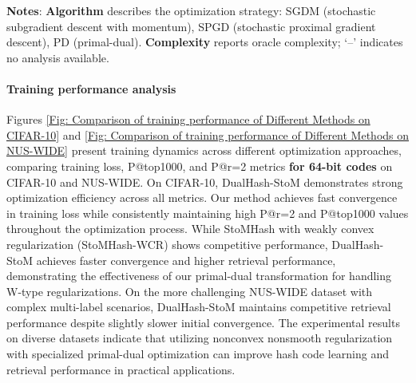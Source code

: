 \begin{table}[htbp]
    \centering
    \caption{Configurations of different W-type regularizations and optimization algorithms for DualHash-StoM and three baselines.}
    \label{tab:4_algorithms_for_hash_regularization_and_update}
    \vspace{-3pt}
    \parbox{0.93\textwidth}{\footnotesize
    \textbf{Notes}: \textbf{Algorithm} describes the optimization strategy: SGDM (stochastic subgradient descent with momentum), SPGD (stochastic proximal gradient descent), PD (primal-dual). \textbf{Complexity} reports oracle complexity; `--' indicates no analysis available.
    }
\end{table}

\paragraph{Training performance analysis}
Figures \ref{Fig: Comparison of training performance of Different Methods on CIFAR-10} and \ref{Fig: Comparison of training performance of Different Methods on NUS-WIDE} present
training dynamics across different optimization approaches, comparing training loss, P@top1000, and P@r=2 metrics \textbf{for 64-bit codes} on CIFAR-10 and NUS-WIDE. On
CIFAR-10, DualHash-StoM demonstrates strong optimization efficiency across all
metrics. Our method achieves fast convergence in training loss while consistently maintaining high P@r=2 and P@top1000 values throughout the
optimization process. While StoMHash with weakly convex regularization (StoMHash-WCR)
shows competitive performance, DualHash-StoM achieves faster convergence
and higher retrieval performance, demonstrating the effectiveness of our
primal-dual transformation for handling W-type regularizations. On the more challenging NUS-WIDE dataset with complex multi-label scenarios, DualHash-StoM maintains
competitive retrieval performance despite slightly slower initial convergence.
The experimental results on diverse datasets indicate that
utilizing nonconvex nonsmooth regularization with specialized primal-dual
optimization can improve hash code learning and retrieval
performance in practical applications.

